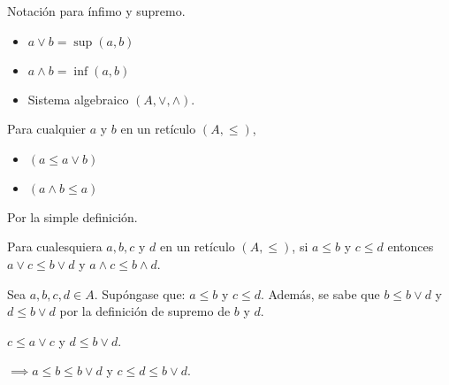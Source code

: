 \begin{nota} Notación para ínfimo y supremo. 
    \begin{itemize}
        \item $a\vee b = \sup(a,b)$
        \item $a\wedge b = \inf(a,b)$
        \item Sistema algebraico $(A,\vee,\wedge)$.
    \end{itemize}
\end{nota}

\begin{teorema}
    Para cualquier $a$ y $b$ en un retículo $(A,\leq)$, 
    \begin{itemize}
        \item $(a\leq a\vee b)$
        \item $(a\wedge b\leq a)$
    \end{itemize}
    \begin{dem}
        Por la simple definición.
    \end{dem}    
\end{teorema}

\begin{teorema}
    Para cualesquiera $a,b,c$ y $d$ en un retículo $(A,\leq)$, si $a\leq b$ y $c\leq d$ entonces $a\vee c\leq b\vee d$ y $a\wedge c\leq b\wedge d$.
    \begin{dem}
        Sea $a,b,c,d\in A$. Supóngase que: $a\leq b$ y  $c\leq d$. Además, se sabe que $b\leq b\vee d$ y $d\leq b\vee d$ por la definición de supremo de $b$ y $d$. 

        $c\leq a\vee c$ y $d\leq b\vee d$. 

        $\implies a\leq b\leq b\vee d$ y $c\leq d\leq b\vee d$.


    \end{dem}
\end{teorema}
